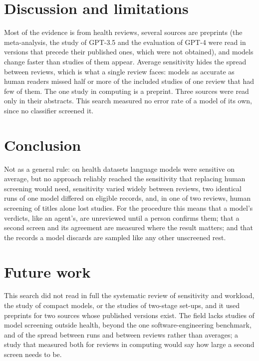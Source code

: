 \section{Discussion and limitations}
\label{sec:llm-discussion}

Most of the evidence is from health reviews, several sources are
preprints (the meta-analysis, the study of GPT-3.5 and the evaluation of
GPT-4 were read in versions that precede their published ones, which
were not obtained), and models
change faster than studies of them appear.
Average sensitivity hides the spread between reviews, which is what a
single review faces: models as accurate as human readers missed half or
more of the included studies of one review that had few of them.
The one study in computing is a preprint.
Three sources were read only in their abstracts.
This search measured no error rate of a model of its own, since no
classifier screened it.

\section{Conclusion}
\label{sec:llm-conclusion}

Not as a general rule: on health datasets language models were sensitive
on average, but no approach reliably reached the sensitivity that
replacing human screening would need, sensitivity varied widely between
reviews, two identical runs of one model differed on eligible records,
and, in one of two reviews, human screening of titles alone lost
studies.
For the procedure this means that a model's verdicts, like an agent's,
are unreviewed until a person confirms them; that a second screen and its
agreement are measured where the result matters; and that the records a
model discards are sampled like any other unscreened rest.

\section{Future work}
\label{sec:llm-future}

This search did not read in full the systematic review of sensitivity
and workload, the study of compact models, or the studies of two-stage
set-ups, and it used preprints for two sources whose published versions
exist.
The field lacks studies of model screening outside health, beyond the one
software-engineering benchmark, and of the spread between runs and
between reviews rather than averages; a study that measured both for
reviews in computing would say how large a second screen needs to be.

